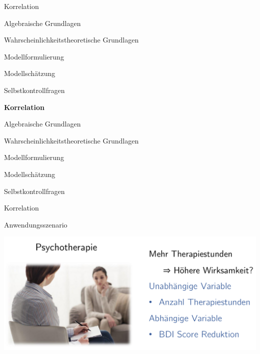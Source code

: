 \documentclass[
  8pt,
  ignorenonframetext,
]{beamer}
\begin{document}
\begin{frame}{}
\protect\hypertarget{section-3}{}
\vfill
\large

Korrelation

Algebraische Grundlagen

Wahrscheinlichkeitstheoretische Grundlagen

Modellformulierung

Modellschätzung

Selbstkontrollfragen \vfill
\end{frame}

\begin{frame}{}
\protect\hypertarget{section-4}{}
\vfill
\large

\textbf{Korrelation}

Algebraische Grundlagen

Wahrscheinlichkeitstheoretische Grundlagen

Modellformulierung

Modellschätzung

Selbstkontrollfragen \vfill
\end{frame}

\begin{frame}{Korrelation}
\protect\hypertarget{korrelation}{}
\large

Anwendungsszenario \vspace{2mm}

\begin{center}\includegraphics[width=0.8\linewidth]{7_Abbildungen/mvda_7_beispielszenario_korrelation} \end{center}
\end{frame}
\end{document}
